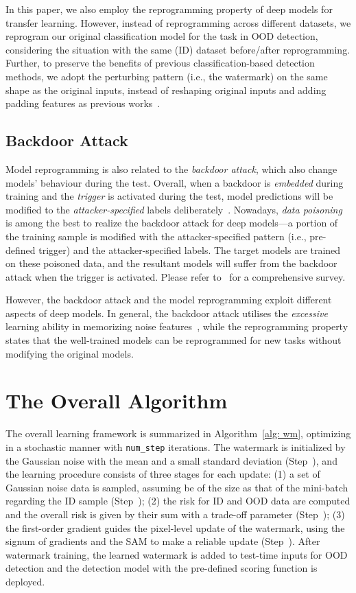 \documentclass{article}
\begin{document}
In this paper, we also employ the reprogramming property of deep models for transfer learning. However, instead of reprogramming across different datasets, we reprogram our original classification model for the task in OOD detection, considering the situation with the same (ID) dataset before/after reprogramming. Further, to preserve the benefits of previous classification-based detection methods, we adopt the perturbing pattern (i.e., the watermark) on the same shape as the original inputs, instead of reshaping original inputs and adding padding features as previous works~\cite{elsayed2018adversarial,YangTC21}. 

\subsection{Backdoor Attack}

Model reprogramming is also related to the \emph{backdoor attack}, which also change models' behaviour during the test. Overall, when a backdoor is \emph{embedded} during training and the \emph{trigger} is activated during the test, model predictions will be modified to the \emph{attacker-specified} labels deliberately~\cite{GuLDG19}. Nowadays, \emph{data poisoning}~\cite{GuLDG19,li2021invisible,LiuM0020,SahaSP20} is among the best to realize the backdoor attack for deep models---a portion of the training sample is modified with the attacker-specified pattern (i.e., pre-defined trigger) and the attacker-specified labels. The target models are trained on these poisoned data, and the resultant models will suffer from the backdoor attack when the trigger is activated. Please refer to~\cite{li2020backdoor} for a comprehensive survey. 

However, the backdoor attack and the model reprogramming exploit different aspects of deep models. In general, the backdoor attack utilises the \emph{excessive} learning ability in memorizing noise features~\cite{li2020backdoor}, while the reprogramming property states that the well-trained models can be reprogrammed for new tasks without modifying the original models. 

\section{The Overall Algorithm} \label{sec: app alg}

The overall learning framework is summarized in Algorithm~\ref{alg: wm}, optimizing in a stochastic manner with \texttt{num\_step} iterations. The watermark is initialized by the Gaussian noise with the  mean and a small standard deviation  (Step~), and the learning procedure consists of three stages for each update: (1) a set of Gaussian noise data is sampled, assuming be of the size  as that of the mini-batch regarding the ID sample (Step~); (2) the risk for ID and OOD data are computed and the overall risk is given by their sum with a trade-off parameter  (Step~); (3) the first-order gradient guides the pixel-level update of the watermark, using the signum of gradients and the SAM to make a reliable update (Step~). After watermark training, the learned watermark is added to test-time inputs for OOD detection and the detection model with the pre-defined scoring function is deployed.
\end{document}
